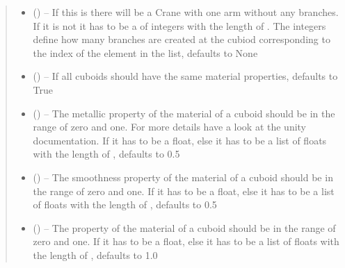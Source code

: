 \documentclass[letterpaper,10pt,english]{sphinxmanual}
\begin{document}
\begin{fulllineitems}
\begin{fulllineitems}
\begin{quote}
\begin{description}
\begin{itemize}
\item {} 
 (\sphinxstyleliteralemphasis{\sphinxupquote{, }}) -- If this is  there will be a Crane with one arm without any branches. If it is not  it has to be a  of integers with the length of .
The integers define how many branches are created at the cubiod corresponding to the index of the element in the list, defaults to None

\item {} 
 (\sphinxstyleliteralemphasis{\sphinxupquote{, }}) -- If all cuboids should have the same material properties, defaults to True

\item {} 
 (\sphinxstyleliteralemphasis{\sphinxupquote{, }}) -- The metallic property of the material of a cuboid should be in the range of zero and one. For more details have a look at the unity documentation. If  it has to be a float, else it has to be a list of floats with the length of , defaults to 0.5

\item {} 
 (\sphinxstyleliteralemphasis{\sphinxupquote{, }}) -- The smoothness property of the material of a cuboid should be in the range of zero and one.
If  it has to be a float, else it has to be a list of floats with the length of , defaults to 0.5

\item {} 
 (\sphinxstyleliteralemphasis{\sphinxupquote{, }}) -- The  property of the material of a cuboid should be in the range of zero and one.
If  it has to be a float, else it has to be a list of floats with the length of , defaults to 1.0


\end{itemize}
\end{description}
\end{quote}
\end{fulllineitems}
\end{fulllineitems}
\end{document}
